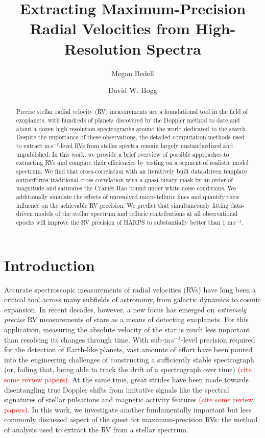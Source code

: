 \documentclass[modern]{aastex61}
\newcommand{\ms}{m\,s$^{-1}$}
\newcommand\todo[1]{\textcolor{red}{#1}}  %
\begin{document}
\graphicspath{ {figures/} }

\title{Extracting Maximum-Precision Radial Velocities from High-Resolution Spectra}

\author{Megan Bedell}

\author{David W. Hogg}

\begin{abstract}
Precise stellar radial velocity (RV) measurements are a foundational tool in the field of exoplanets, with hundreds of planets discovered by the Doppler method to date and about a dozen high-resolution spectrographs around the world dedicated to the search. Despite the importance of these observations, the detailed computation methods used to extract \ms-level RVs from stellar spectra remain largely unstandardized and unpublished. In this work, we provide a brief overview of possible approaches to extracting RVs and compare their efficiencies by testing on a segment of realistic model spectrum. We find that cross-correlation with an iteratively built data-driven template outperforms traditional cross-correlation with a quasi-binary mask by an order of magnitude and saturates the Cram\'{e}r-Rao bound under white-noise conditions. We additionally simulate the effects of unresolved micro-telluric lines and quantify their influence on the achievable RV precision. We predict that simultaneously fitting data-driven models of the stellar spectrum and telluric contributions at all observational epochs will improve the RV precision of HARPS to substantially better than 1 \ms.
\end{abstract}

\section{Introduction}

Accurate spectroscopic measurements of radial velocities (RVs) have long been a critical tool across many subfields of astronomy, from galactic dynamics to cosmic expansion. In recent decades, however, a new focus has emerged on \textit{extremely precise} RV measurements of stars as a means of detecting exoplanets. For this application, measuring the absolute velocity of the star is much less important than resolving its changes through time. With sub-\ms-level precision required for the detection of Earth-like planets, vast amounts of effort have been poured into the engineering challenges of constructing a sufficiently stable spectrograph (or, failing that, being able to track the drift of a spectrograph over time) \todo{(cite some review papers)}. At the same time, great strides have been made towards disentangling true Doppler shifts from imitative signals like the spectral signatures of stellar pulsations and magnetic activity features \todo{(cite some review papers)}.  In this work, we investigate another fundamentally important but less commonly discussed aspect of the quest for maximum-precision RVs: the method of analysis used to extract the RV from a stellar spectrum.
\end{document}
